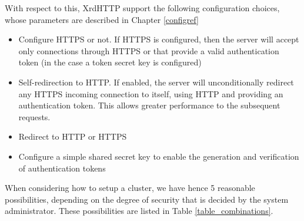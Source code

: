 \documentclass[12pt]{article} %
\begin{document}
With respect to this, XrdHTTP support the following configuration choices, whose parameters are described in Chapter \ref{configref}

\begin{itemize}
 \item Configure HTTPS or not. If HTTPS is configured, then the server will accept only connections through HTTPS or that provide a valid authentication token (in the case a token secret key is configured)
 \item Self-redirection to HTTP. If enabled, the server will unconditionally redirect any HTTPS incoming connection to itself, using HTTP and providing an authentication token. This allows greater performance to the subsequent requests.
 \item Redirect to HTTP or HTTPS
 \item Configure a simple shared secret key to enable the generation and verification of authentication tokens
\end{itemize}


When considering how to setup a cluster, we have hence 5 reasonable possibilities, depending on the degree of security that is decided by the system administrator. These possibilities are listed in Table \ref{table_combinations}.
\end{document}
